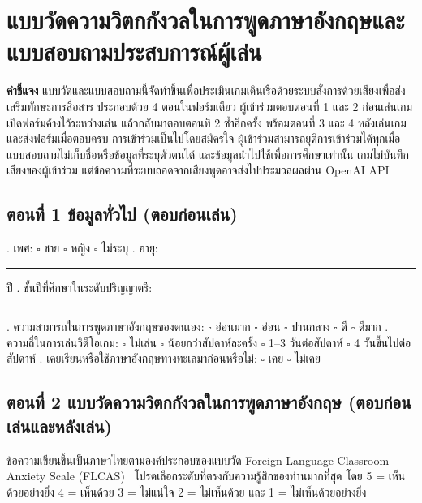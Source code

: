 
\setcounter{chapter}{-1}

\section*{แบบวัดความวิตกกังวลในการพูดภาษาอังกฤษและแบบสอบถามประสบการณ์ผู้เล่น}

\textbf{คำชี้แจง} แบบวัดและแบบสอบถามนี้จัดทำขึ้นเพื่อประเมินเกมเดินเรือด้วยระบบสั่งการด้วยเสียงเพื่อส่งเสริมทักษะการสื่อสาร ประกอบด้วย 4 ตอนในฟอร์มเดียว ผู้เข้าร่วมตอบตอนที่ 1 และ 2 ก่อนเล่นเกม เปิดฟอร์มค้างไว้ระหว่างเล่น แล้วกลับมาตอบตอนที่ 2 ซ้ำอีกครั้ง พร้อมตอนที่ 3 และ 4 หลังเล่นเกม และส่งฟอร์มเมื่อตอบครบ การเข้าร่วมเป็นไปโดยสมัครใจ ผู้เข้าร่วมสามารถยุติการเข้าร่วมได้ทุกเมื่อ แบบสอบถามไม่เก็บชื่อหรือข้อมูลที่ระบุตัวตนได้ และข้อมูลนำไปใช้เพื่อการศึกษาเท่านั้น เกมไม่บันทึกเสียงของผู้เข้าร่วม แต่ข้อความที่ระบบถอดจากเสียงพูดอาจส่งไปประมวลผลผ่าน OpenAI API

\subsection*{ตอนที่ 1 ข้อมูลทั่วไป (ตอบก่อนเล่น)}
. เพศ: $\square$ ชาย \quad $\square$ หญิง \quad $\square$ ไม่ระบุ . อายุ: \rule{2cm}{0.4pt} ปี . ชั้นปีที่ศึกษาในระดับปริญญาตรี: \rule{1cm}{0.4pt} . ความสามารถในการพูดภาษาอังกฤษของตนเอง: $\square$ อ่อนมาก \quad $\square$ อ่อน \quad $\square$ ปานกลาง \quad $\square$ ดี \quad $\square$ ดีมาก . ความถี่ในการเล่นวิดีโอเกม: $\square$ ไม่เล่น \quad $\square$ น้อยกว่าสัปดาห์ละครั้ง \quad $\square$ 1--3 วันต่อสัปดาห์ \quad $\square$ 4 วันขึ้นไปต่อสัปดาห์ . เคยเรียนหรือใช้ภาษาอังกฤษทางทะเลมาก่อนหรือไม่: $\square$ เคย \quad $\square$ ไม่เคย

\clearpage
\subsection*{ตอนที่ 2 แบบวัดความวิตกกังวลในการพูดภาษาอังกฤษ (ตอบก่อนเล่นและหลังเล่น)}
ข้อความเขียนขึ้นเป็นภาษาไทยตามองค์ประกอบของแบบวัด Foreign Language Classroom Anxiety Scale (FLCAS)~\cite{horwitz1986} โปรดเลือกระดับที่ตรงกับความรู้สึกของท่านมากที่สุด โดย 5 = เห็นด้วยอย่างยิ่ง 4 = เห็นด้วย 3 = ไม่แน่ใจ 2 = ไม่เห็นด้วย และ 1 = ไม่เห็นด้วยอย่างยิ่ง


